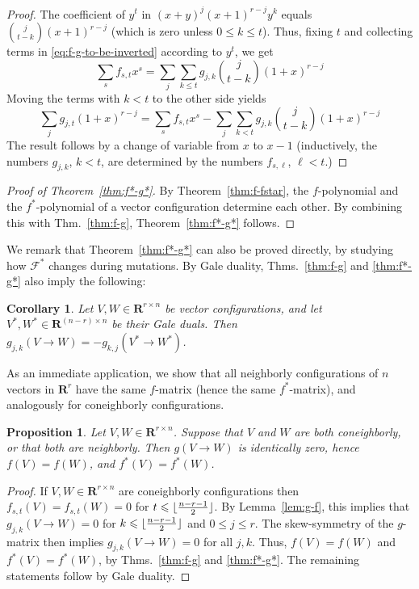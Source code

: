 \documentclass[11pt]{article}
\newtheorem{corollary}[theorem]{Corollary}
\newtheorem{proposition}[theorem]{Proposition}
\renewcommand{\leq}{\leqslant}
\newcommand{\R}{\mathbf{R}}
\DeclarePairedDelimiter\floor{\lfloor}{\rfloor}
\begin{document}
\begin{proof}
The coefficient of $y^t$ in $(x+y)^j (x+1)^{r-j}y^k$ equals $\binom{j}{t-k}(x+1)^{r-j}$ (which is zero unless $0\leq k\leq t$). Thus, fixing $t$ and collecting terms in \eqref{eq:f-g-to-be-inverted} according to $y^t$, we get
\[
\sum_s f_{s,t} x^s =\sum_j \sum_{k\leq t} g_{j,k}\binom{j}{t-k}(1+x)^{r-j}
\]
Moving the terms with $k<t$ to the other side yields
\[
\sum_j g_{j,t} (1+x)^{r-j} = \sum_s f_{s,t} x^s - \sum_j \sum_{k<t} g_{j,k}\binom{j}{t-k}(1+x)^{r-j}
\]
The result follows by a change of variable from $x$ to $x-1$ (inductively, the numbers $g_{j,k}$, $k<t$, are determined by the numbers $f_{s,\ell}$, $\ell<t$.)
\end{proof}
%
\begin{proof}[Proof of Theorem~\ref{thm:f*-g*}] 
By Theorem~\ref{thm:f-fstar}, the $f$-polynomial and the $f^*$-polynomial of a vector configuration determine each other. By combining this with Thm.~\ref{thm:f-g}, Theorem~\ref{thm:f*-g*} follows.\end{proof}
%
We remark that Theorem~\ref{thm:f*-g*} can also be proved directly, by studying how $\mathcal{F}^*$ changes during mutations. By Gale duality, Thms.~\ref{thm:f-g} and \ref{thm:f*-g*} also imply the following:
%
\begin{corollary}
\label{cor:g-pair-dual}
Let $V,W\in \R^{r\times n}$ be vector configurations, and let $V^*,W^*\in  \R^{(n-r)\times n}$ be their Gale duals. Then $g_{j,k}(V \to W) = -g_{k,j}(V^* \to W^*)$.
\end{corollary}
%
As an immediate application, we show that all neighborly configurations of $n$ vectors in $\R^r$ have the same $f$-matrix (hence the same $f^*$-matrix), and analogously for coneighborly configurations.
\begin{proposition}
\label{prop:f-neighborly-coneighborly}
Let $V,W \in \R^{r\times n}$. Suppose that $V$ and $W$ are both coneighborly, or that both are neighborly. Then $g(V\to W)$ is identically zero, hence $f(V)=f(W)$, and $f^*(V)=f^*(W)$.
\end{proposition}
\begin{proof} 
If $V,W \in \R^{r\times n}$ are coneighborly configurations then $f_{s,t}(V)=f_{s,t}(W)=0$ for $t \leq \floor{\frac{n-r-1}{2}}$. By Lemma~\ref{lem:g-f}, this implies that $g_{j,k}(V\to W)=0$ for $k\leq  \floor{\frac{n-r-1}{2}}$ and $0\leq j\leq r$. The skew-symmetry of the $g$-matrix then implies  $g_{j,k}(V\to W)=0$ for all $j,k$. Thus, $f(V)=f(W)$ and $f^*(V)=f^*(W)$, by Thms.~\ref{thm:f-g} and \ref{thm:f*-g*}. The remaining statements follow by Gale duality.
\end{proof}
%
%
\end{document}
